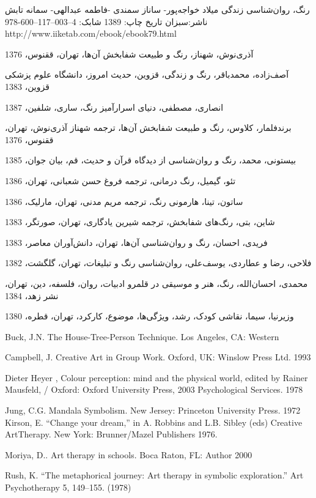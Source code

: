 \documentclass[12pt]{report}
\begin{document}
\begin{thebibliography}{10}

\newblock
رنگ، روان‌شناسی زندگی
\newblock
میلاد خواجه‌پور- ساناز سمندی -فاطمه عبدالهی- سمانه تابش
\newblock
ناشر:سبزان
\newblock
تاريخ چاپ: 1389
\newblock
شابک: 4–003–117–600-978 
\newblock
http://www.iiketab.com/ebook/ebook79.html

\newblock
آذری‌نوش، شهناز، رنگ و طبیعت شفابخش آن‌ها، تهران، ققنوس، 1376

\bibitem{}
\newblock 
آصف‌زاده، محمدباقر، رنگ و زندگی، قزوین، حدیث امروز، دانشگاه علوم پزشکی قزوین، 1383

\bibitem{}
\newblock 
انصاری، مصطفی، دنیای اسرارآمیز رنگ، ساری، شلفین، 1387

\bibitem{}
\newblock 
برندفلمار، کلاوس، رنگ و طبیعت شفابخش آن‌ها، ترجمه شهناز آذری‌نوش، تهران، ققنوس، 1376

\bibitem{}
\newblock 
بیستونی، محمد، رنگ و روان‌شناسی از دیدگاه قرآن و حدیث، قم، بیان جوان، 1385

\bibitem{}
\newblock 
تئو، گیمیل، رنگ درمانی، ترجمه فروغ حسن شعبانی، تهران، 1386

\bibitem{}
\newblock 
ساتون، تینا، هارمونی رنگ، ترجمه مریم مدنی، تهران، مارلیک، 1386

\bibitem{}
\newblock 
شاین، بتی، رنگ‌های شفابخش، ترجمه شیرین یادگاری، تهران، صورتگر، 1383

\bibitem{}
\newblock 
فریدی، احسان، رنگ و روان‌شناسی آن‌ها، تهران، دانش‌آوران معاصر، 1383

\bibitem{}
\newblock 
فلاحی، رضا و عطاردی، یوسف‌علی، روان‌شناسی رنگ و تبلیغات، تهران، گلگشت، 1382

\bibitem{}
\newblock 
محمدی، احسان‌الله، رنگ، هنر و موسیقی در قلمرو ادبیات، روان، فلسفه، دین، تهران، نشر زهد، 1384

\bibitem{}
\newblock 
وزیرنیا، سیما، نقاشی کودک، رشد، ویژگی‌ها، موضوع، کارکرد، تهران، قطره، 1380

\bibitem{}
\newblock 
Buck, J.N. The House-Tree-Person Technique. Los Angeles, CA: Western

\bibitem{}
\newblock 
Campbell, J. Creative Art in Group Work. Oxford, UK: Winslow Press Ltd. 1993

\bibitem{}
\newblock 
Dieter Heyer , Colour perception: mind and the physical world, edited by Rainer Mausfeld, /  Oxford: Oxford University Press, 2003 Psychological Services. 1978 

\bibitem{}
\newblock 
Jung, C.G. Mandala Symbolism. New Jersey: Princeton University Press. 1972
Kirson, E. “Change your dream,” in A. Robbins and L.B. Sibley (eds) Creative ArtTherapy. New York: Brunner/Mazel Publishers 1976.  

\bibitem{}
\newblock 
 Moriya, D.. Art therapy in schools. Boca Raton, FL: Author 2000

\bibitem{}
\newblock 
 Rush, K. “The metaphorical journey: Art therapy in symbolic exploration.” Art Psychotherapy 5, 149–155. (1978) 

\end{thebibliography}
\end{document}

